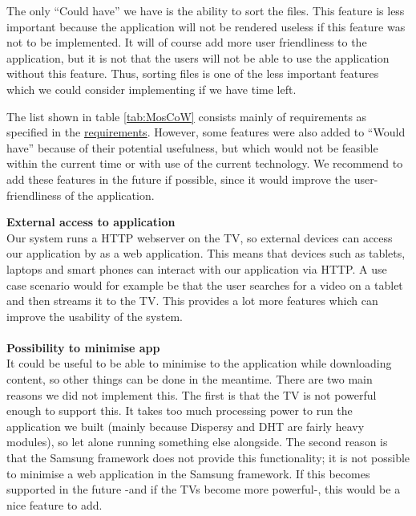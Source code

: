 The only ``Could have'' we have is the ability to sort the files. This feature is less 
important because the application will not be rendered useless
if this feature was not to be implemented. It will of course add more user friendliness to 
the application, but it is not that the users
 will not be able to use the application without this feature. Thus, sorting files is one of 
 the less important features which we could consider
 implementing if we have time left.
 
The list shown in table \ref{tab:MosCoW} consists mainly of requirements as specified in the 
\hyperref[sec:requirements]{requirements}.
However, some features were also added to ``Would have'' because of their potential 
usefulness, but which would not be feasible within the current time or with use of the 
current technology. We recommend to add these features in the future if possible, since it 
would improve the user-friendliness of the application.

\textbf{External access to application} \\
Our system runs a HTTP webserver on the TV, so external devices can access our application by as a web application.
This means that devices such as tablets, laptops and smart phones can interact with our application via HTTP.
A use case scenario would for example be that the user searches for a video on a tablet and then streams it to the TV.
This provides a lot more features which can improve the usability of the system.
\\\\
\textbf{Possibility to minimise app} \\
It could be useful to be able to minimise to the application while downloading content, so other things can be done in the meantime.
There are two main reasons we did not implement this. The first is that the TV is not powerful enough to support this. It takes too much
processing power to run the application we built (mainly because Dispersy\cite{dispersy} and DHT\cite{dht} are fairly heavy modules), so let alone running something else alongside.
The second reason is that the Samsung framework does not provide this functionality; it is not possible to minimise a web application in the Samsung 
framework. If this becomes supported in the future -and if the TV\textquotesingle s become more powerful-, this would be a nice feature to add.

